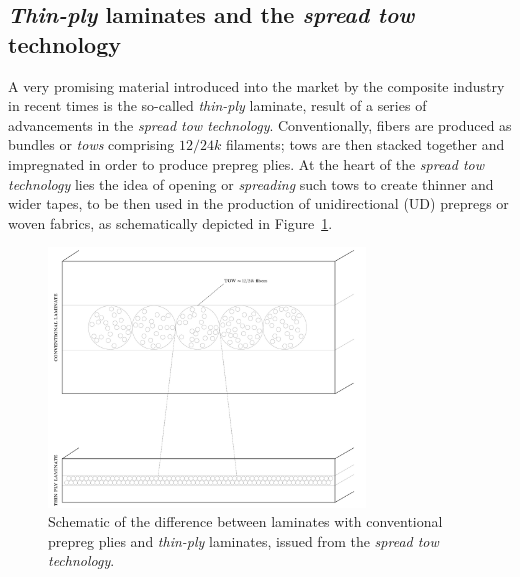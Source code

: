 \begin{description}
\section{\textit{Thin-ply} laminates and the \textit{spread tow} technology}

A very promising material introduced into the market by the composite industry in recent times is the so-called \emph{thin-ply} laminate, result of a series of advancements in the \textit{spread tow technology}. Conventionally, fibers are produced as bundles or \textit{tows} comprising $12/24k$ filaments; tows are then stacked together and impregnated in order to produce prepreg plies. At the heart of the \textit{spread tow technology} lies the idea of opening or \textit{spreading} such tows to create thinner and wider tapes, to be then used in the production of unidirectional (UD) prepregs or woven fabrics, as schematically depicted in Figure~\ref{chap1:fig:spreadtowtech}.

\begin{figure}[!h]
\includegraphics[width=0.75\textwidth]{pics/spread-tow-tech.pdf}
\caption{Schematic of the difference between laminates with conventional prepreg plies and \emph{thin-ply} laminates, issued from the \textit{spread tow technology}.}\label{chap1:fig:spreadtowtech}
\end{figure}


\end{description}
